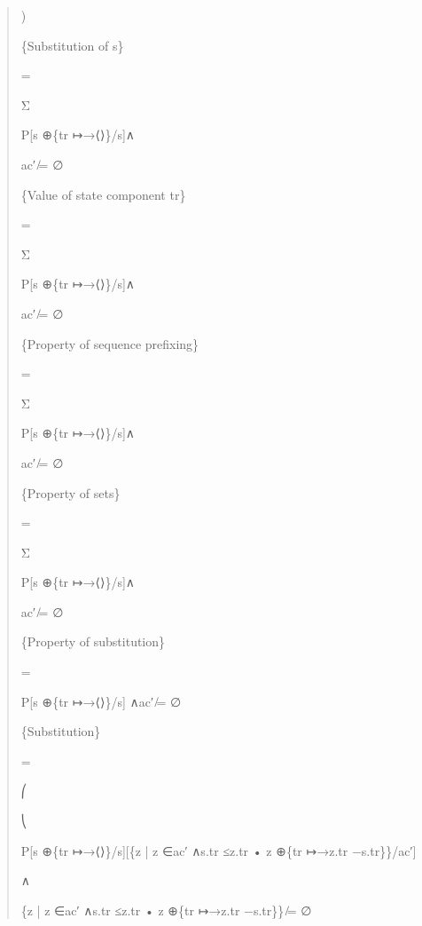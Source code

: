 \documentclass[11pt]{article}
\begin{document}
\begin{quote}\small\raggedright
)
\par
[\{z | z ∈ac′ ∧s.tr ≤z.tr\}/ac′]
\par
[s ⊕\{tr ↦→⟨⟩\},\{z | z ∈ac′ ∧s.tr ≤z.tr • z ⊕\{tr ↦→z.tr −s.tr\}\}/s,ac′]
\par
\{Substitution of s\}
\par
=
\par
Σ
\par
P[s ⊕\{tr ↦→⟨⟩\}/s]∧
\par
ac′ ̸= ∅
\par
[\{z | z ∈ac′ ∧(s ⊕\{tr ↦→⟨⟩\}).tr ≤z.tr\}/ac′]
\par
[\{z | z ∈ac′ ∧s.tr ≤z.tr • z ⊕\{tr ↦→z.tr −s.tr\}\}/ac′]
\par
\{Value of state component tr\}
\par
=
\par
Σ
\par
P[s ⊕\{tr ↦→⟨⟩\}/s]∧
\par
ac′ ̸= ∅
\par
[\{z | z ∈ac′ ∧⟨⟩≤z.tr\}/ac′]
\par
[\{z | z ∈ac′ ∧s.tr ≤z.tr • z ⊕\{tr ↦→z.tr −s.tr\}\}/ac′]
\par
\{Property of sequence prefixing\}
\par
=
\par
Σ
\par
P[s ⊕\{tr ↦→⟨⟩\}/s]∧
\par
ac′ ̸= ∅
\par
[\{z | z ∈ac′\}/ac′]
\par
[\{z | z ∈ac′ ∧s.tr ≤z.tr • z ⊕\{tr ↦→z.tr −s.tr\}\}/ac′]
\par
\{Property of sets\}
\par
=
\par
Σ
\par
P[s ⊕\{tr ↦→⟨⟩\}/s]∧
\par
ac′ ̸= ∅
\par
[ac′/ac′]
\par
[\{z | z ∈ac′ ∧s.tr ≤z.tr • z ⊕\{tr ↦→z.tr −s.tr\}\}/ac′]
\par
\{Property of substitution\}
\par
=
\par
P[s ⊕\{tr ↦→⟨⟩\}/s] ∧ac′ ̸= ∅
\par
[\{z | z ∈ac′ ∧s.tr ≤z.tr • z ⊕\{tr ↦→z.tr −s.tr\}\}/ac′]
\par
\{Substitution\}
\par
=
\par
⎛
\par
⎝
\par
P[s ⊕\{tr ↦→⟨⟩\}/s][\{z | z ∈ac′ ∧s.tr ≤z.tr • z ⊕\{tr ↦→z.tr −s.tr\}\}/ac′]
\par
∧
\par
\{z | z ∈ac′ ∧s.tr ≤z.tr • z ⊕\{tr ↦→z.tr −s.tr\}\} ̸= ∅
\end{quote}
\end{document}

